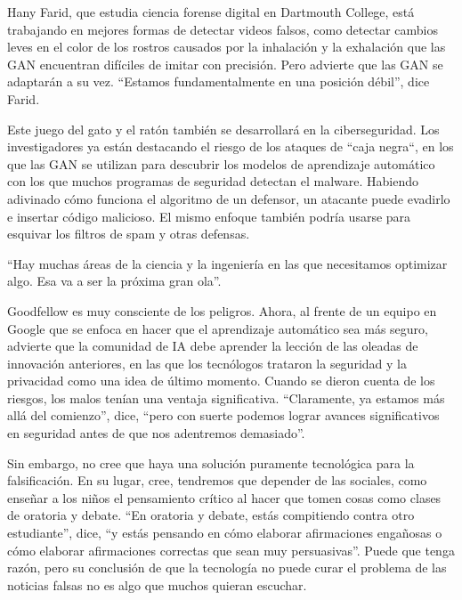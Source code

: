 \documentclass[a4paper]{article}
\begin{document}
 Hany Farid, que estudia ciencia forense digital en Dartmouth 
 College, está trabajando en mejores formas de detectar videos  
 falsos, como detectar cambios leves en el color de los rostros  
 causados por la inhalación y la exhalación que las GAN encuentran 
 difíciles de imitar con precisión. Pero advierte que las GAN se  
 adaptarán a su vez. ``Estamos fundamentalmente en una posición  
 débil'', dice Farid.



Este juego del gato y el ratón también se desarrollará en la 
ciberseguridad. Los investigadores ya están destacando el riesgo 
de los ataques de ``caja negra``, en los que las GAN se utilizan 
para descubrir los modelos de aprendizaje automático con los que 
muchos programas de seguridad detectan el malware. Habiendo 
adivinado cómo funciona el algoritmo de un defensor, un atacante 
puede evadirlo e insertar código malicioso. El mismo enfoque 
también podría usarse para esquivar los filtros de spam y otras 
defensas.

``Hay muchas áreas de la ciencia y la ingeniería en las que 
necesitamos optimizar algo. Esa va a ser la próxima gran ola''.

Goodfellow es muy consciente de los peligros. Ahora, al frente de 
un equipo en Google que se enfoca en hacer que el aprendizaje 
automático sea más seguro, advierte que la comunidad de IA debe 
aprender la lección de las oleadas de innovación anteriores, en 
las que los tecnólogos trataron la seguridad y la privacidad como 
una idea de último momento. Cuando se dieron cuenta de los 
riesgos, los malos tenían una ventaja significativa. ``Claramente, 
ya estamos más allá del comienzo'', dice, ``pero con suerte 
podemos lograr avances significativos en seguridad antes de que 
nos adentremos demasiado''.

Sin embargo, no cree que haya una solución puramente tecnológica 
para la falsificación. En su lugar, cree, tendremos que depender 
de las sociales, como enseñar a los niños el pensamiento crítico 
al hacer que tomen cosas como clases de oratoria y debate. ``En 
oratoria y debate, estás compitiendo contra otro estudiante'', 
dice, ``y estás pensando en cómo elaborar afirmaciones engañosas o 
cómo elaborar afirmaciones correctas que sean muy persuasivas''. 
Puede que tenga razón, pero su conclusión de que la tecnología no 
puede curar el problema de las noticias falsas no es algo que 
muchos quieran escuchar.
\end{document}
